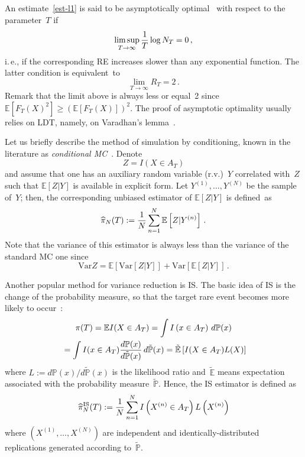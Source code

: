 \begin{multicols}{2}
An estimate~\eqref{est-l1} is said to be asymptotically optimal~\cite{Dieker,Dieker1}
 with respect to the parameter~$T$ if
$$
\limsup\limits_{T \to \infty} \displaystyle\frac{\displaystyle 1\mathstrut}{\displaystyle T\mathstrut} \log N_T =0 \,,
$$
i.\,e., if the corresponding RE increases  slower than any exponential function.
 The latter condition is equivalent~to
\begin{equation*}
\lim\limits_{T \to \infty} R_T = 2\,.
\end{equation*}
Remark that the limit above is always less or equal~2 
since $\mathbb{E} [F_T(X)^2] \ge (\mathbb{E} [F_T(X)])^2$. 
The proof of asymptotic optimality usually relies on LDT, namely, on Varadhan's 
lemma~\cite{Dieker}.

Let us briefly describe the method of simulation by conditioning, known in the 
literature as \textit{conditional MC}~\cite{Ross}. Denote
 $$
 Z=I\left(X \in A_T\right)
 $$
and assume that one has an auxiliary random variable (r.v.)~$Y$ correlated with~$Z$ 
such that $\mathbb{E} [Z|Y]$ is available in explicit form. Let $Y^{(1)},\ldots,Y^{(N)}$ 
be the sample of~$Y$; then, the corresponding unbiased estimator 
of $\mathbb{E} [Z|Y]$ is defined~as
\begin{equation*}
\widehat{\pi}_{N}(T) := \displaystyle\frac{\displaystyle 1\mathstrut}{\displaystyle N\mathstrut} \sum\limits_{n=1}^N \mathbb{E} \left[Z|Y^{(n)}\right]\,.
\end{equation*}
Note that the variance of this estimator is always less than
the variance of the standard MC one since
\begin{equation}
\mathrm{Var} Z=\mathbb{E} \left[\mathrm{Var}[Z|Y]\right]+ \mathrm{Var} \left[\mathbb{E}[Z|Y]\right]\,. 
\label{BMC-1}
\end{equation}

Another popular method for variance reduction is IS. 
The basic idea of  IS  is the change of the probability measure, so that the target 
rare event becomes more likely to occur~\cite{Heidelberger}:
\begin{multline*}
\pi(T) = \mathbb{E} I(X \in A_T) = \int I\left(x \in A_T\right)\,d\mathbb{P}(x)\\
{}= \int I(x \in A_T)\displaystyle\frac{\displaystyle d\mathbb{P}(x)\mathstrut}{\displaystyle d\tilde{\mathbb{P}}(x)\mathstrut}\,d\tilde{\mathbb{P}}(x)=\tilde{\mathbb{E}}\left[I(X \in A_T)L(X)  \right]\hspace*{-1.1258pt}
\end{multline*}
where $L:= {d\mathbb{P}(x)}/{d\tilde{\mathbb{P}}(x)}$ is the likelihood ratio 
and~$\tilde{\mathbb{E}}$ means expectation associated with the probability 
measure~$\tilde{\mathbb{P}}$.
Hence, the IS estimator is defined as
\begin{equation*}
\widehat{\pi}^{\mathrm{IS}}_N(T):=\displaystyle\frac{\displaystyle 1\mathstrut}{\displaystyle N\mathstrut} \sum\limits_{n=1}^N 
I\left(X^{(n)} \in A_T\right) L\left(X^{(n)}\right)
\end{equation*}
where $(X^{(1)},\ldots,X^{(N)})$ are independent and identically-distributed 
replications generated according 
to~$\tilde{\mathbb{P}}$.


\end{multicols}
